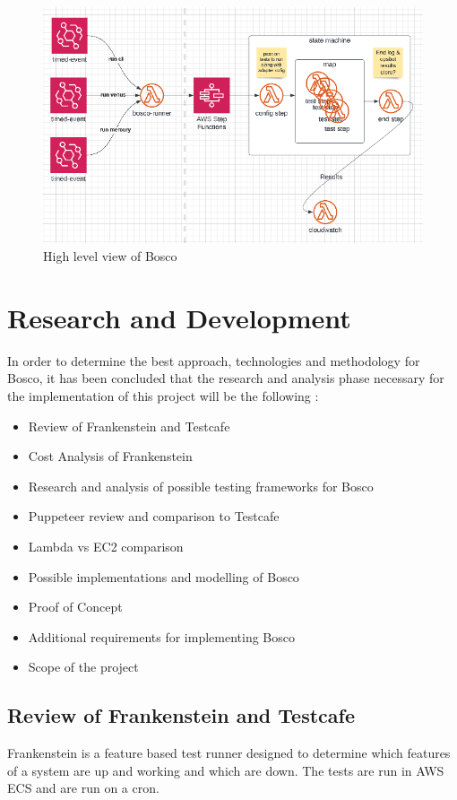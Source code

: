 \documentclass[12pt,a4paper,titlepage]{report}
\begin{document}
\begin{figure}[ht]
  \centering
  \includegraphics[width=\textwidth,height=\textheight,keepaspectratio]{./diagrams/bosco_high_level.png}
  \caption{High level view of Bosco}
\end{figure}

\chapter{Research and Development}

In order to determine the best approach, technologies and methodology for Bosco, it has been concluded that the research and analysis phase necessary for the implementation of this project will be the following :

\begin{itemize}
  \item Review of Frankenstein and Testcafe
  \item Cost Analysis of Frankenstein
  \item Research and analysis of possible testing frameworks for Bosco
  \item Puppeteer review and comparison to Testcafe
  \item Lambda vs EC2 comparison
  \item Possible implementations and modelling of Bosco
  \item Proof of Concept
  \item Additional requirements for implementing Bosco
  \item Scope of the project
\end{itemize}

\section{Review of Frankenstein and Testcafe}
Frankenstein is a feature based test runner designed to determine
which features of a system are up and working and which are down.
The tests are run in AWS ECS and are run on a cron.
\end{document}
